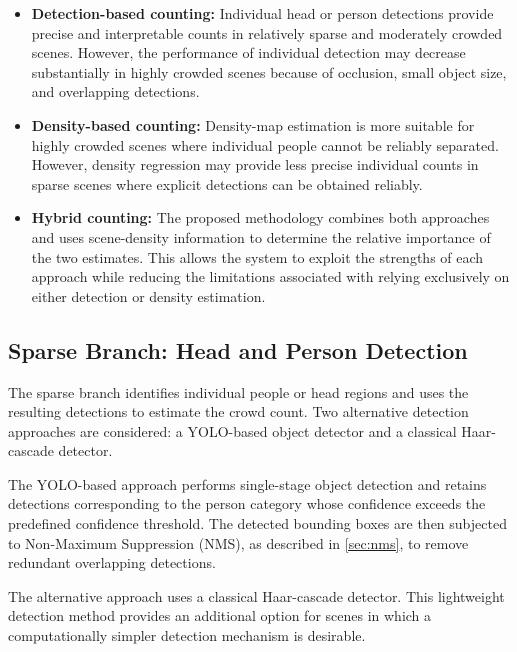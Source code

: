 \documentclass[12pt,a4paper]{report}
\begin{document}
\begin{itemize}

\item \textbf{Detection-based counting:}
Individual head or person detections provide precise and interpretable
counts in relatively sparse and moderately crowded scenes. However, the
performance of individual detection may decrease substantially in highly
crowded scenes because of occlusion, small object size, and overlapping
detections.

\item \textbf{Density-based counting:}
Density-map estimation is more suitable for highly crowded scenes where
individual people cannot be reliably separated. However, density regression
may provide less precise individual counts in sparse scenes where explicit
detections can be obtained reliably.

\item \textbf{Hybrid counting:}
The proposed methodology combines both approaches and uses scene-density
information to determine the relative importance of the two estimates. This
allows the system to exploit the strengths of each approach while reducing
the limitations associated with relying exclusively on either detection or
density estimation.

\end{itemize}


\subsection{Sparse Branch: Head and Person Detection}

The sparse branch identifies individual people or head regions and uses the
resulting detections to estimate the crowd count. Two alternative detection
approaches are considered: a YOLO-based object detector and a classical
Haar-cascade detector.

The YOLO-based approach performs single-stage object detection and retains
detections corresponding to the person category whose confidence exceeds
the predefined confidence threshold. The detected bounding boxes are then
subjected to Non-Maximum Suppression (NMS), as described in \cref{sec:nms}, to remove redundant overlapping detections.

The alternative approach uses a classical Haar-cascade detector. This
lightweight detection method provides an additional option for scenes in
which a computationally simpler detection mechanism is desirable.
\end{document}
